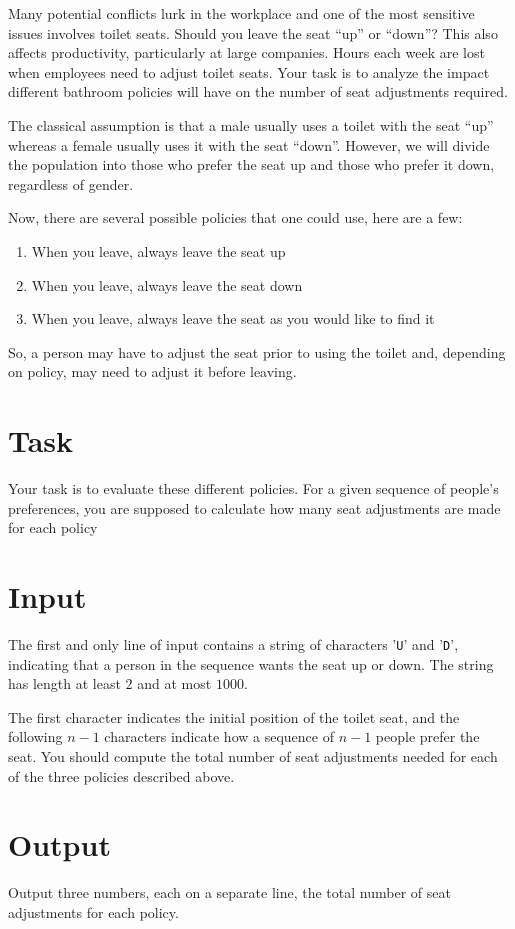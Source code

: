 Many potential conflicts lurk in the workplace and one of the
most sensitive issues involves toilet seats. Should you leave the
seat ``up'' or ``down''? This also affects productivity, particularly at
large companies. Hours each week are lost when employees need
to adjust toilet seats. Your task is to analyze the impact different
bathroom policies will have on the number of seat adjustments
required.

The classical assumption is that a male usually uses a toilet
with the seat ``up'' whereas a female usually uses it with the seat
``down''. However, we will divide the population into those who
prefer the seat up and those who prefer it down, regardless of gender.

Now, there are several possible policies that one could use, here are a few:
\begin{enumerate}
    \item When you leave, always leave the seat up
    \item When you leave, always leave the seat down
    \item When you leave, always leave the seat as you would like to find it
\end{enumerate}
So, a person may have to adjust the seat prior to using the toilet and, depending on policy, may need to adjust
it before leaving.

\section*{Task}
Your task is to evaluate these different policies. For a given sequence of people's preferences, you are supposed to
calculate how many seat adjustments are made for each policy

\section*{Input}
The first and only line of input contains a string of characters '\texttt{U}' and '\texttt{D}', indicating that a person in the sequence wants the seat up or down.
The string has length at least $2$ and at most $1000$.

The first character indicates the initial position of the toilet seat, and the following $n - 1$ characters indicate how a sequence of $n - 1$ people prefer the seat.
You should compute the total number of seat adjustments needed for each of the three policies described above.

\section*{Output}
Output three numbers, each on a separate line, the total number of seat adjustments for each policy.
